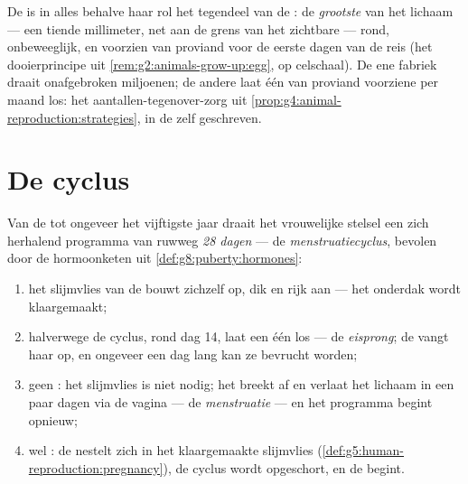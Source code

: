 \begin{example}\label{ex:g8:reproductive-systems:egg}
De  is in alles behalve haar rol het tegendeel van de : de
\emph{grootste}  van het lichaam --- een tiende millimeter, net aan de
grens van het zichtbare --- rond, onbeweeglijk, en voorzien van proviand
voor de eerste dagen van de reis (het dooierprincipe uit
\cref{rem:g2:animals-grow-up:egg}, op celschaal). De ene fabriek draait
onafgebroken miljoenen; de andere laat één van proviand voorziene  per
maand los: het aantallen-tegenover-zorg uit
\cref{prop:g4:animal-reproduction:strategies}, in de  zelf
geschreven.
\end{example}

\section{De cyclus}

\begin{proposition}[De menstruatiecyclus]\label{prop:g8:reproductive-systems:cycle}
Van de  tot ongeveer het vijftigste jaar draait het vrouwelijke
stelsel een zich herhalend programma van ruwweg \emph{28 dagen} --- de
\emph{menstruatiecyclus}, bevolen door de
hormoonketen uit \cref{def:g8:puberty:hormones}:
\begin{enumerate}
  \item het slijmvlies van de  bouwt zichzelf op, dik en rijk
        aan  --- het onderdak wordt klaargemaakt;
  \item halverwege de cyclus, rond dag 14, laat een  één  los
        --- de \emph{eisprong}; de  vangt haar op,
        en ongeveer een dag lang kan ze bevrucht worden;
  \item geen : het slijmvlies is niet nodig; het breekt af en
        verlaat het lichaam in een paar dagen via de vagina --- de
        \emph{menstruatie} --- en het programma begint
        opnieuw;
  \item wel : de  nestelt zich in het klaargemaakte
        slijmvlies
        (\cref{def:g5:human-reproduction:pregnancy}), de cyclus wordt
        opgeschort, en de  begint.
\end{enumerate}
\end{proposition}
\admitted

